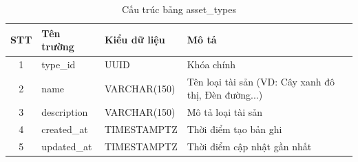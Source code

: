\renewcommand{\arraystretch}{1.3}
\begin{longtable}{|c|p{3.5cm}|p{4cm}|p{6cm}|}
    \caption{Cấu trúc bảng asset\_types}
    \label{tab:db_asset_types} \\

    \hline
    \textbf{STT} & \textbf{Tên trường} & \textbf{Kiểu dữ liệu} & \textbf{Mô tả} \\ \hline
    \endfirsthead

    \hline
    \endhead
    \hline
    \endfoot
    \hline
    \endlastfoot

    1 & type\_id & UUID & Khóa chính \\ \hline
    2 & name & VARCHAR(150) & Tên loại tài sản (VD: Cây xanh đô thị, Đèn đường...) \\ \hline
    3 & description & VARCHAR(150) & Mô tả loại tài sản \\ \hline
    4 & created\_at & TIMESTAMPTZ & Thời điểm tạo bản ghi \\ \hline
    5 & updated\_at & TIMESTAMPTZ & Thời điểm cập nhật gần nhất \\
\end{longtable}